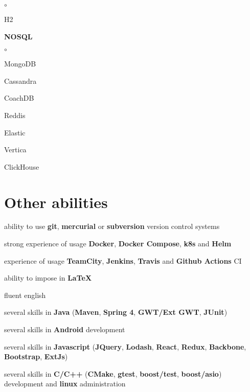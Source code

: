 \documentclass{cv}
\begin{document}
\begin{multicols}{3}
\begin {list}{\textbullet}{\itemsep=0mm}
\begin {list}{$\circ$}{}
          \item H2
        \end{list}
      \item \textbf{NOSQL}
        \begin {list}{$\circ$}{}
          \item MongoDB
          \item Cassandra
          \item CoachDB
          \item Reddis
          \item Elastic
          \item Vertica
          \item ClickHouse
        \end{list}
    \end{list}
  \end{multicols}


\section* {Other abilities}
\begin {list}{\textbullet}{\itemsep=0mm}
  \item ability to use \textbf{git}, \textbf{mercurial} or \textbf{subversion}
    version control systems
  \item strong experience of usage \textbf{Docker}, \textbf{Docker Compose},
    \textbf{k8s} and \textbf{Helm}
  \item experience of usage \textbf{TeamCity}, \textbf{Jenkins},
    \textbf{Travis} and \textbf{Github Actions} CI
  \item ability to impose in \textbf{LaTeX}
  \item fluent english
  \item several skills in \textbf{Java} (\textbf{Maven}, \textbf{Spring 4},
    \textbf{GWT/Ext GWT}, \textbf{JUnit})
  \item several skills in \textbf{Android} development
  \item several skills in \textbf{Javascript} (\textbf{JQuery},
    \textbf{Lodash}, \textbf{React}, \textbf{Redux}, \textbf{Backbone},
    \textbf{Bootstrap}, \textbf{ExtJs})
  \item several skills in \textbf{C/C++} (\textbf{CMake}, \textbf{gtest},
    \textbf{boost/test}, \textbf{boost/asio}) development and \textbf{linux}
    administration
\end {list}
\end{document}
